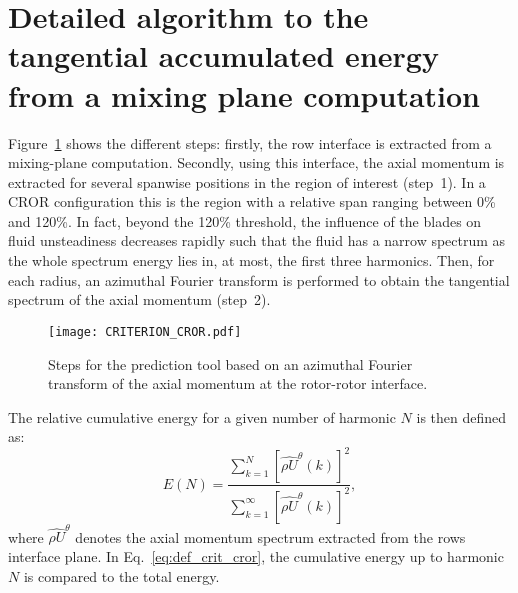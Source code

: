 \section{Detailed algorithm to the tangential accumulated energy from a mixing plane computation}
\label{app:epsilon_cror_steps}
Figure~\ref{fig:criterion_cror} shows the different steps: firstly, the row
interface is extracted from a mixing-plane computation.
Secondly, using this interface,
the axial momentum is extracted for several spanwise positions in the region of interest
(step~\textcircled{\small{1}}).
In a CROR configuration this is the region with a 
relative span ranging between 0\% and 120\%.
In fact, beyond the 120\% threshold, the influence of the blades on fluid
unsteadiness decreases rapidly such that the fluid 
has a narrow spectrum as the whole spectrum energy lies in, at
most, the first three harmonics.
Then, for each radius, an azimuthal Fourier transform
is performed to obtain the tangential spectrum of the
axial momentum (step~\textcircled{\small{2}}).
\begin{figure}[htp]
  \centering
  \texttt{[image: CRITERION\_CROR.pdf]}
  \caption{Steps for the prediction tool based on an azimuthal
  Fourier transform of the axial momentum at the rotor-rotor interface.}
  \label{fig:criterion_cror}
\end{figure}
The relative cumulative energy for a given number of harmonic $N$ is then defined as:
\begin{equation}
    E (N) = \frac{\sum_{k=1}^N \left[ \widehat{\rho U}^{\theta} (k) \right]^2}{ 
    \sum_{k=1}^\infty \left[ \widehat{\rho U}^{\theta} (k) \right]^2},
    \label{eq:def_crit_cror}
\end{equation} 
where $\widehat{\rho U}^{\theta}$ denotes the axial momentum spectrum
extracted from the rows interface plane. In Eq.~\eqref{eq:def_crit_cror},
the cumulative energy up to harmonic $N$ is 
compared to the total energy.
